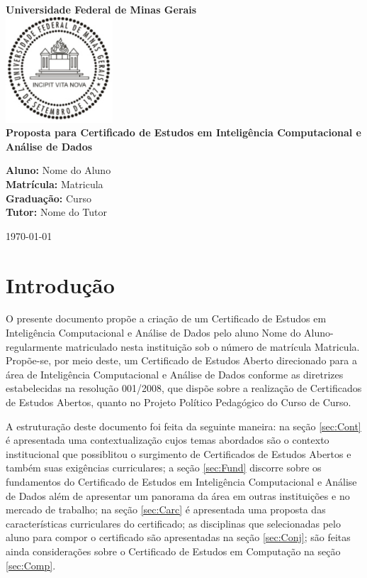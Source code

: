 \documentclass{article}
\newcommand{\aluno}{Nome do Aluno}
\newcommand{\tutor}{Nome do Tutor}
\newcommand{\matricula}{Matricula}
\newcommand{\curso}{Curso} %
\begin{document}
	\AdvanceDate[0] %
	\begin{titlepage}
		\vfill
		{
			\centering
			\bfseries\LARGE
			Universidade Federal de Minas Gerais\\
			\vfill
			\includegraphics[width=4cm]{logoUFMG.pdf} \\
			\vfill
			\Huge{Proposta para Certificado de Estudos em Inteligência Computacional e Análise de Dados}\\
			\vskip4cm
		}
		
		\begin{flushleft}
			\textbf{Aluno:} \aluno \\
			\textbf{Matrícula:} \matricula \\
			\textbf{Graduação:} \curso \\
			\textbf{Tutor:} \tutor \\
		\end{flushleft}
		
		\vfill
		\vfill
		\centering
		\today
	\end{titlepage}
	
	\tableofcontents \vfill \vfill \pagebreak
	
	\section{Introdução} \label{sec:Int}
	O presente documento propõe a criação de um Certificado de Estudos em Inteligência Computacional e Análise de Dados pelo aluno \aluno - regularmente matriculado nesta instituição sob o número de matrícula \matricula. Propõe-se, por meio deste, um Certificado de Estudos Aberto direcionado para a área de Inteligência Computacional e Análise de Dados conforme as diretrizes estabelecidas na resolução 001/2008, que dispõe sobre a realização de Certificados de Estudos Abertos, quanto no Projeto Político Pedagógico do Curso de \curso. \par
	A estruturação deste documento foi feita da seguinte maneira: na seção \ref{sec:Cont} é apresentada uma contextualização cujos temas abordados são o contexto institucional que possiblitou o surgimento de Certificados de Estudos Abertos e também suas exigências curriculares; a seção \ref{sec:Fund} discorre sobre os fundamentos do Certificado de Estudos em Inteligência Computacional e Análise de Dados além de apresentar um panorama da área em outras instituições e no mercado de trabalho; na seção \ref{sec:Carc} é apresentada uma proposta das características curriculares do certificado; as disciplinas que selecionadas pelo aluno para compor o certificado são apresentadas na seção \ref{sec:Conj}; são feitas ainda considerações sobre o Certificado de Estudos em Computação na seção \ref{sec:Comp}. 
	
\end{document}
